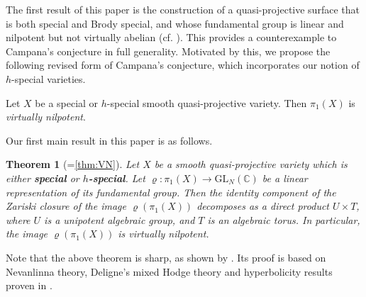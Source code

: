 \documentclass[11pt,english]{smfart}
\theoremstyle{plain}
\newtheorem{thmx}{Theorem}
\theoremstyle{definition}
\theoremstyle{remark}
\numberwithin{equation}{subsection}
\theoremstyle{plain}
\newcommand{\bC}{\mathbb{C}}
\begin{document}
The first result of this paper is the construction of a quasi-projective surface that is both special and Brody special,   and whose fundamental group is linear and nilpotent but not virtually abelian (cf. ). This provides a counterexample to Campana’s conjecture in full generality. Motivated by this, we propose the following revised form of Campana’s conjecture, which incorporates our notion of $h$-special varieties.
\begin{conj}\label{conj:revised2}
	Let $X$ be a   special  or $h$-special smooth quasi-projective variety.     Then  $ \pi_1(X) $ is \emph{virtually nilpotent}. 
\end{conj} 
 Our  first main result in this paper  is  as follows.  
\begin{thmx}[=\cref{thm:VN}]\label{main5}
	Let $X$ be a smooth quasi-projective variety which is either \textbf{special} or \textbf{$h$-special}. Let $\varrho: \pi_1(X) \to \mathrm{GL}_N(\mathbb{C})$ be a linear representation of its fundamental group. 
	Then the identity component of the Zariski closure of the image $\varrho(\pi_1(X))$  decomposes as a direct product $U\times T$, where $U$ is a  unipotent algebraic group, and $T$ is an algebraic torus. 
	In particular, the image $\varrho(\pi_1(X))$ is  {virtually nilpotent}.
\end{thmx} 
  
 
 
Note that the above theorem is sharp, as shown by .  Its proof is based on   Nevanlinna theory, Deligne's mixed Hodge theory and hyperbolicity results proven in  \cite[Theorem A]{CDY22}.  
\end{document}
